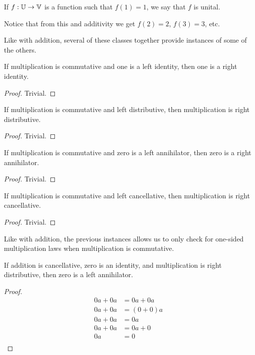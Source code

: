 \documentclass[../../math.tex]{subfiles}
\begin{document}
\begin{class}
    If $f : \mathbb{U} \to \mathbb{V}$ is a function such that $f(1) = 1$, we say that $f$ is
    unital.
\end{class}
Notice that from this and additivity we get $f(2) = 2$, $f(3) = 3$, etc.

Like with addition, several of these classes together provide instances of some
of the others.

\begin{instance}
    If multiplication is commutative and one is a left identity, then one is a
    right identity.
\end{instance}
\begin{proof}
    Trivial.
\end{proof}

\begin{instance} \label{ldist_rdist}
    If multiplication is commutative and left distributive, then multiplication
    is right distributive.
\end{instance}
\begin{proof}
    Trivial.
\end{proof}

\begin{instance} \label{mult_lanni_ranni}
    If multiplication is commutative and zero is a left annihilator, then zero
    is a right annihilator.
\end{instance}
\begin{proof}
    Trivial.
\end{proof}

\begin{instance}
    If multiplication is commutative and left cancellative, then multiplication
    is right cancellative.
\end{instance}
\begin{proof}
    Trivial.
\end{proof}

Like with addition, the previous instances allows us to only check for one-sided
multiplication laws when multiplication is commutative.

\begin{instance} \label{ring_mult_lanni}
    If addition is cancellative, zero is an identity, and multiplication is
    right distributive, then zero is a left annihilator.
\end{instance}
\begin{proof}
    \begin{align*}
        0a + 0a &= 0a + 0a \\
        0a + 0a &= (0 + 0)a \\
        0a + 0a &= 0a \\
        0a + 0a &= 0a + 0 \\
        0a &= 0 \\
    \end{align*}
\end{proof}
\end{document}
